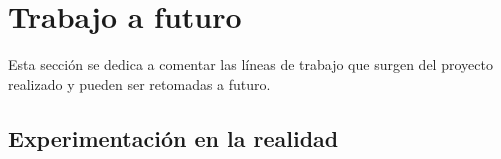 










\section{Trabajo a futuro}

Esta sección se dedica a comentar las líneas de trabajo que surgen del proyecto
realizado y pueden ser retomadas a futuro.

\subsection{Experimentación en la realidad}

